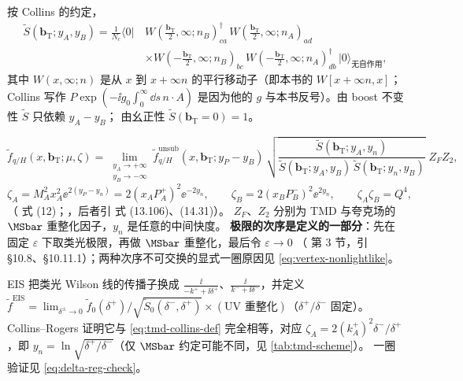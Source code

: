 \begin{definition}[软因子]
\label{def:soft-factor}
按 Collins 的约定\cite{Collins2011,AybatRogers2011}，
\begin{equation}
  \begin{split}
  \tilde S(\boldsymbol b_{\mathrm T};y_A,y_B)=\frac1{N_c}\langle0|\,
  &W(\tfrac{\boldsymbol b_{\mathrm T}}2,\infty;n_B)^\dagger_{ca}\,W(\tfrac{\boldsymbol b_{\mathrm T}}2,\infty;n_A)_{ad}\\
  &\times W(-\tfrac{\boldsymbol b_{\mathrm T}}2,\infty;n_B)_{bc}\,W(-\tfrac{\boldsymbol b_{\mathrm T}}2,\infty;n_A)^\dagger_{db}\,|0\rangle_{\text{无自作用}},
  \end{split}
  \label{eq:soft-factor-def}
\end{equation}
其中 $W(x,\infty;n)$ 是从 $x$ 到 $x+\infty n$ 的平行移动子（即本书的 $W[x+\infty n,x]$；Collins 写作
$P\exp(-\ii g_0\int_0^\infty\dd s\,n\cdot A)$ 是因为他的 $g$ 与本书反号）。由 boost 不变性 $\tilde S$ 只依赖 $y_A-y_B$；
由幺正性 $\tilde S(\boldsymbol b_{\mathrm T}=0)=1$。
\end{definition}

\begin{definition}
\label{def:tmd-collins}
\begin{equation}
  \tilde f_{q/H}(x,\boldsymbol b_{\mathrm T};\mu,\zeta)
  =\lim_{\substack{y_A\to+\infty\\ y_B\to-\infty}}
  \tilde f^{\mathrm{unsub}}_{q/H}(x,\boldsymbol b_{\mathrm T};y_P-y_B)\,
  \sqrt{\frac{\tilde S(\boldsymbol b_{\mathrm T};y_A,y_n)}{\tilde S(\boldsymbol b_{\mathrm T};y_A,y_B)\,\tilde S(\boldsymbol b_{\mathrm T};y_n,y_B)}}\;Z_FZ_2,
  \label{eq:tmd-collins-def}
\end{equation}
\begin{equation}
  \zeta_A=M_A^2x_A^2\ee^{2(y_P-y_n)}=2(x_AP_A^+)^2\ee^{-2y_n},\qquad
  \zeta_B=2(x_BP_B^-)^2\ee^{2y_n},\qquad \zeta_A\zeta_B=Q^4 ,
  \label{eq:zeta-def}
\end{equation}
（\cite{AybatRogers2011} 式 (12)；\cite{CollinsRogers2013}，后者引 \cite{Collins2011} 式 (13.106)、(14.31)）。
$Z_F$、$Z_2$ 分别为 TMD 与夸克场的 $\MSbar$ 重整化因子，$y_n$ 是任意的中间快度。
\textbf{极限的次序是定义的一部分}：先在固定 $\varepsilon$ 下取类光极限，再做 $\MSbar$ 重整化，最后令 $\varepsilon\to0$
（\cite{CollinsRogers2013} 第 3 节，引 \cite{Collins2011} §10.8、§10.11.1）；两种次序不可交换的显式一圈原因见
\eqref{eq:vertex-nonlightlike}。
\end{definition}

\begin{remark}
\label{rem:delta-regulator}
EIS\cite{EchevarriaIdilbiScimemi2012} 把类光 Wilson 线的传播子换成 $\frac{\ii}{-k^++\ii\delta^+}$、$\frac{\ii}{k^-+\ii\delta^-}$，并定义
$\tilde f^{\mathrm{EIS}}=\lim_{\delta^\pm\to0}\tilde f_0(\delta^+)/\sqrt{\tilde S_0(\delta^-,\delta^+)}\times(\text{UV 重整化})$（$\delta^+/\delta^-$ 固定）。
Collins--Rogers 证明\cite{CollinsRogers2013}它与 \eqref{eq:tmd-collins-def} 完全相等，对应
$\zeta_A=2(k_A^+)^2\delta^-/\delta^+$，即 $y_n=\ln\sqrt{\delta^+/\delta^-}$（仅 $\MSbar$ 约定可能不同，见 \cref{tab:tmd-scheme}）。
一圈验证见 \eqref{eq:delta-reg-check}。
\end{remark}

